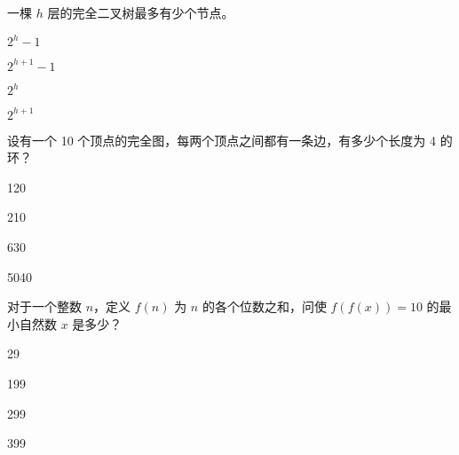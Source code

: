 \documentclass{exam-zh}
\begin{document}
\begin{solution}

\end{solution}

\begin{question}
    一棵 $h$ 层的完全二叉树最多有少个节点。\paren[A]
    \begin{choices}
        \item $2^{h}-1$
        \item $2^{h+1} - 1$
        \item $2^h$
        \item $2^{h+1}$
    \end{choices}
\end{question}

\begin{solution}
    
\end{solution}



\begin{question}
    设有一个 10 个顶点的完全图，每两个顶点之间都有一条边，有多少个长度为 4 的环？\paren[C]

\begin{choices}
    \item 120
    \item 210
    \item 630
    \item 5040
\end{choices}
\end{question}


\begin{solution}

\end{solution}


\begin{question}
    对于一个整数 $n$，定义 $f(n)$ 为 $n$ 的各个位数之和，问使 $f(f(x))=10$ 的最小自然数 $x$ 是多少？\paren[B]

\begin{choices}
    \item 29
    \item 199
    \item 299
    \item 399
\end{choices}
\end{question}

\begin{solution}
    
\end{solution}
\end{document}
